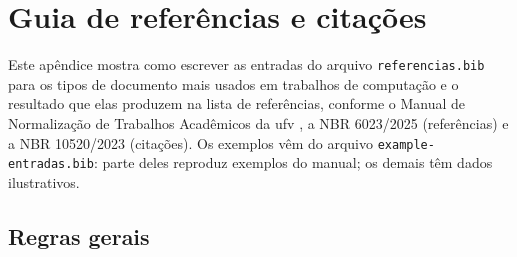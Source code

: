 
\newcommand{\refex}[3]{%
  \par\medskip\noindent\textbf{#3}\par\nopagebreak\smallskip
                  {example/example-entradas.bib}%
  \par\nopagebreak\smallskip\noindent\textit{Resultado na lista de referências:}\par\nopagebreak
  \begin{SingleSpacing}\noindent\hspace{1cm}\begin{minipage}{0.9\textwidth}%
    \raggedright\fullcite{#2}.\end{minipage}\end{SingleSpacing}\par\medskip}

\chapter{Guia de referências e citações}\label{ap:referencias}

Este apêndice mostra como escrever as entradas do arquivo \texttt{referencias.bib}
para os tipos de documento mais usados em trabalhos de computação e o resultado que
elas produzem na lista de referências, conforme o Manual de Normalização de Trabalhos
Acadêmicos da \ac{ufv} \cite{manualUFV}, a NBR 6023/2025 (referências) e a NBR 10520/2023
(citações). Os exemplos vêm do arquivo \texttt{example-entradas.bib}: parte deles
reproduz exemplos do manual; os demais têm dados ilustrativos.

\section{Regras gerais}

